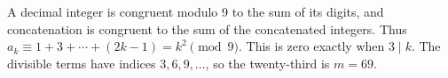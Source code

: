 A decimal integer is congruent modulo 9 to the sum of its digits, and concatenation is congruent to the sum of the concatenated integers. Thus $a_k\equiv1+3+\cdots+(2k-1)=k^2\pmod9$. This is zero exactly when $3\mid k$. The divisible terms have indices $3,6,9,\ldots$, so the twenty-third is $\boxed{m=69}$.
